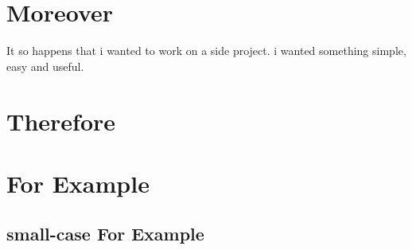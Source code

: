 \documentclass{article}
\begin{document}
\section{Moreover}

It so happens that i wanted to work on a side project. \Moreover i wanted something simple, easy and useful.

\Moreover

\Moreover

\Moreover

\Moreover



\section{Therefore}

\Therefore 

\Therefore

\Therefore

\Therefore

\Therefore

\section{For Example}

\Forexample 

\Forexample

\Forexample

\Forexample

\Forexample

\subsection{small-case For Example} 

\smallForexample

\smallForexample

\smallForexample
\end{document}
